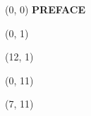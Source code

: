 \documentclass[10pt]{article}
\begin{document}
\begin{textblock}{23}(0, 0)
    \center\huge\textbf{PREFACE}
\end{textblock}

\begin{textblock}{11}(0, 1)
    {
    \small
    {}
    }
\end{textblock}

\begin{textblock}{11}(12, 1)
    {
    \small
    {}
    }
\end{textblock}

\begin{textblock}{6}(0, 11)
    \small
    {}
\end{textblock}

\begin{textblock}{16}(7, 11)
    \small
    {}
\end{textblock}
\end{document}
